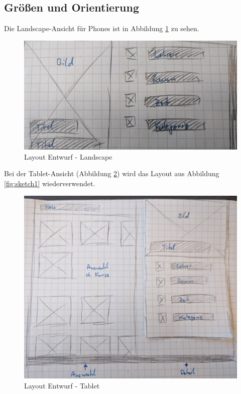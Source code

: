 \documentclass[11pt, oneside]{article}
\begin{document}
\subsection{Größen und Orientierung}
Die Landscape-Ansicht für Phones ist in Abbildung \ref{fig:sketch2} zu sehen.
\begin{figure}[h]
	\begin{center}
	\includegraphics[scale=0.1]{sketch_2}
	\end{center}
	\caption{Layout Entwurf - Landscape}
	\label{fig:sketch2}
\end{figure}
Bei der Tablet-Ansicht (Abbildung \ref{fig:sketch_tablet}) wird das Layout aus Abbildung \ref{fig:sketch1} wiederverwendet.
\begin{figure}[h]
	\begin{center}
	\includegraphics[scale=0.09]{sketch_tablet}
	\end{center}
	\caption{Layout Entwurf - Tablet}
	\label{fig:sketch_tablet}
\end{figure}
\end{document}
